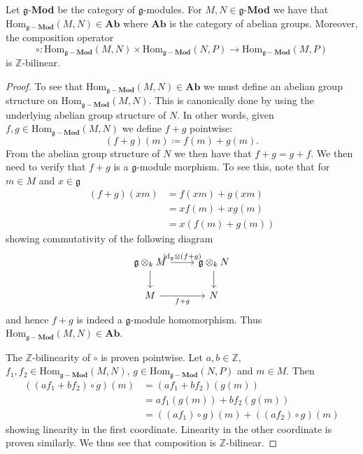\begin{lemma}
  \label{lem:abenriched}
  Let $ \mathfrak{g} $-\textbf{Mod} be the category of $ \mathfrak{g} $-modules. For $ M,N \in \mathfrak{g} $-\textbf{Mod} we have that $ \text{Hom}_{\mathfrak{g}-\mathbf{Mod}}(M, N) \in \mathbf{Ab} $ where $ \mathbf{Ab} $ is the category of abelian groups. Moreover, the composition operator
  \begin{equation*}
  \circ:  \text{Hom}_{\mathfrak{g}-\mathbf{Mod}}(M, N) \times \text{Hom}_{\mathfrak{g}-\mathbf{Mod}}(N, P) \to \text{Hom}_{\mathfrak{g}-\mathbf{Mod}}(M, P)
  \end{equation*}
  is $ \mathbb{Z} $-bilinear.
\end{lemma}
\begin{proof}
  To see that $ \text{Hom}_{\mathfrak{g}-\mathbf{Mod}}(M, N) \in \mathbf{Ab} $ we must define an abelian group structure on $ \text{Hom}_{\mathfrak{g}-\mathbf{Mod}}(M, N) $. This is canonically done by using the underlying abelian group structure of $ N $. In other words, given $ f,g \in   \text{Hom}_{\mathfrak{g}-\mathbf{Mod}}(M, N) $ we define $ f + g $ pointwise:
  \begin{equation}
    (f+g)(m) \coloneqq f(m) + g(m)
    \label{eq:abstr}
  .\end{equation}
  From the abelian group structure of $ N $ we then have that $ f + g = g + f $. We then need to verify that $ f + g $ is a $ \mathfrak{g} $-module morphism. To see this, note that for $ m \in M $ and $ x \in \mathfrak{g} $
  \begin{align*}
    (f + g)(xm) &= f(xm) + g(xm) \\
                &= xf(m) + xg(m) \\
                &= x(f(m) + g(m))
  \end{align*}
  showing commutativity of the following diagram
  \[\begin{tikzcd}
	  {\mathfrak{g} \otimes_k M} & {\mathfrak{g} \otimes_k N} \\
	  M & N
	  \arrow[from=1-1, to=2-1]
	  \arrow["{f+g}"', from=2-1, to=2-2]
	  \arrow[from=1-2, to=2-2]
	  \arrow["{\text{id}_\mathfrak{g} \otimes (f + g)}", from=1-1, to=1-2]
  \end{tikzcd}\]
  and hence $ f+g $ is indeed a $ \mathfrak{g} $-module homomorphism. Thus $ \text{Hom}_{\mathfrak{g}-\mathbf{Mod}}(M, N) \in \mathbf{Ab} $.

  The $ \mathbb{Z} $-bilinearity of $ \circ $ is proven pointwise. Let $ a,b \in \mathbb{Z} $, $ f_1, f_2 \in  \text{Hom}_{\mathfrak{g}-\mathbf{Mod}}(M, N) $, $ g \in \text{Hom}_{\mathfrak{g}-\mathbf{Mod}}(N, P)  $ and $ m \in M $. Then
  \begin{align*}
    ((af_1 + bf_2) \circ g) (m) &= (af_1 + bf_2)(g(m)) \\
                                &= af_1(g(m)) + bf_2(g(m)) \\
                                &= ((af_1)\circ g)(m) + ((af_2)\circ g)(m)
  \end{align*}
  showing linearity in the first coordinate. Linearity in the other coordinate is proven similarly. We thus see that composition is $ \mathbb{Z} $-bilinear.
\end{proof}

